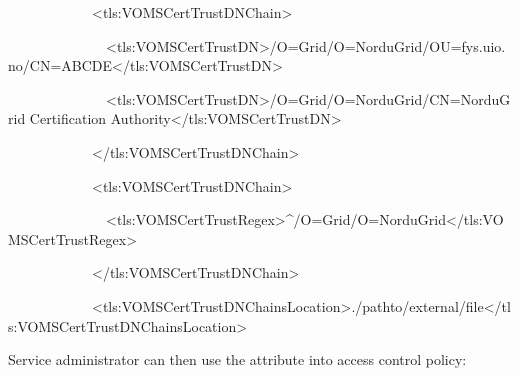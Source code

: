 \documentclass{article}
\begin{document}
{\color{black}
\ \ \ \ \ \ \ \ \ \ \ \ {\textless}tls:VOMSCertTrustDNChain{\textgreater}}


\bigskip

{\color{black}
\ \ \ \ \ \ \ \ \ \ \ \ \ \ {\textless}tls:VOMSCertTrustDN{\textgreater}/O=Grid/O=NorduGrid/OU=fys.uio.no/CN=ABCDE{\textless}/tls:VOMSCertTrustDN{\textgreater}}


\bigskip

{\color{black}
\ \ \ \ \ \ \ \ \ \ \ \ \ \ {\textless}tls:VOMSCertTrustDN{\textgreater}/O=Grid/O=NorduGrid/CN=NorduGrid
Certification Authority{\textless}/tls:VOMSCertTrustDN{\textgreater}}


\bigskip

{\color{black}
\ \ \ \ \ \ \ \ \ \ \ \ {\textless}/tls:VOMSCertTrustDNChain{\textgreater}}


\bigskip

{\color{black}
\ \ \ \ \ \ \ \ \ \ \ \ {\textless}tls:VOMSCertTrustDNChain{\textgreater}}


\bigskip

{\color{black}
\ \ \ \ \ \ \ \ \ \ \ \ \ \ {\textless}tls:VOMSCertTrustRegex{\textgreater}\^{}/O=Grid/O=NorduGrid{\textless}/tls:VOMSCertTrustRegex{\textgreater}}


\bigskip

{\color{black}
\ \ \ \ \ \ \ \ \ \ \ \ {\textless}/tls:VOMSCertTrustDNChain{\textgreater}}


\bigskip

{\color{black}
\ \ \ \ \ \ \ \ \ \ \ \ {\textless}tls:VOMSCertTrustDNChainsLocation{\textgreater}./pathto/external/file{\textless}/tls:VOMSCertTrustDNChainsLocation{\textgreater}}


\bigskip

{\color{black}
Service administrator can then use the attribute into access control
policy:}
\end{document}
